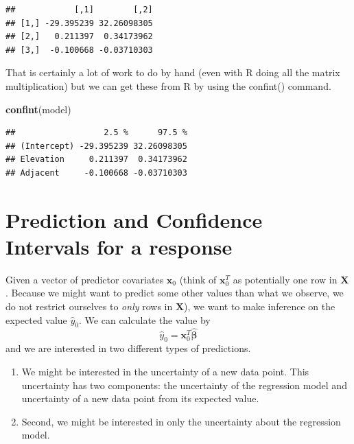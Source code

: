 \documentclass[]{book}
\newenvironment{Shaded}{\begin{snugshade}}{\end{snugshade}}
\newcommand{\KeywordTok}[1]{\textcolor[rgb]{0.13,0.29,0.53}{\textbf{{#1}}}}
\newcommand{\NormalTok}[1]{{#1}}
\theoremstyle{definition}
\theoremstyle{definition}
\theoremstyle{remark}
\begin{document}
\begin{verbatim}
##            [,1]        [,2]
## [1,] -29.395239 32.26098305
## [2,]   0.211397  0.34173962
## [3,]  -0.100668 -0.03710303
\end{verbatim}

That is certainly a lot of work to do by hand (even with R doing all the
matrix multiplication) but we can get these from R by using the
confint() command.

\begin{Shaded}
\begin{Highlighting}[]
\KeywordTok{confint}\NormalTok{(model)}
\end{Highlighting}
\end{Shaded}

\begin{verbatim}
##                  2.5 %      97.5 %
## (Intercept) -29.395239 32.26098305
## Elevation     0.211397  0.34173962
## Adjacent     -0.100668 -0.03710303
\end{verbatim}

\section{Prediction and Confidence Intervals for a
response}\label{prediction-and-confidence-intervals-for-a-response}

Given a vector of predictor covariates \(\boldsymbol{x}_{0}\) (think of
\(\boldsymbol{x}_{0}^{T}\) as potentially one row in \(\boldsymbol{X}\).
Because we might want to predict some other values than what we observe,
we do not restrict ourselves to \emph{only} rows in \(\boldsymbol{X}\)),
we want to make inference on the expected value \(\hat{y}_{0}\). We can
calculate the value by
\[\hat{y}_{0}=\boldsymbol{x}_{0}^{T}\hat{\boldsymbol{\beta}}\] and we
are interested in two different types of predictions.

\begin{enumerate}
\def\labelenumi{\arabic{enumi}.}
\item
  We might be interested in the uncertainty of a new data point. This
  uncertainty has two components: the uncertainty of the regression
  model and uncertainty of a new data point from its expected value.
\item
  Second, we might be interested in only the uncertainty about the
  regression model.
\end{enumerate}
\end{document}
